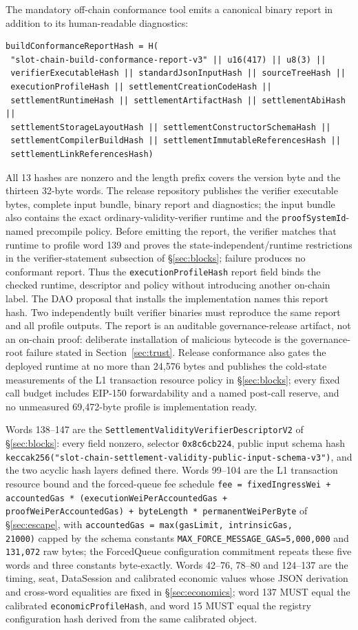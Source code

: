 \documentclass[a4paper,11pt]{article}
\newcommand{\code}[1]{\nolinkurl{#1}}
\begin{document}
The mandatory off-chain conformance tool emits a canonical binary report in
addition to its human-readable diagnostics:
\begin{verbatim}
buildConformanceReportHash = H(
 "slot-chain-build-conformance-report-v3" || u16(417) || u8(3) ||
 verifierExecutableHash || standardJsonInputHash || sourceTreeHash ||
 executionProfileHash || settlementCreationCodeHash ||
 settlementRuntimeHash || settlementArtifactHash || settlementAbiHash ||
 settlementStorageLayoutHash || settlementConstructorSchemaHash ||
 settlementCompilerBuildHash || settlementImmutableReferencesHash ||
 settlementLinkReferencesHash)
\end{verbatim}
All 13 hashes are nonzero and the length prefix covers the version byte and
the thirteen 32-byte words.  The release repository publishes the verifier
executable bytes, complete input bundle, binary report and diagnostics; the
input bundle also contains the exact ordinary-validity-verifier runtime and
the \code{proofSystemId}-named precompile policy.  Before emitting the report,
the verifier matches that runtime to profile word 139 and proves the
state-independent/runtime restrictions in the verifier-statement subsection of
\S\ref{sec:blocks}; failure produces no conformant report.  Thus the
\code{executionProfileHash} report field binds the checked runtime, descriptor
and policy without introducing another on-chain label.  The DAO proposal that
installs the implementation names this report hash.  Two independently built
verifier binaries must reproduce the same report and all profile outputs.  The
report is an auditable governance-release artifact, not an on-chain proof:
deliberate installation of malicious bytecode is the governance-root failure
stated in Section~\ref{sec:trust}.  Release conformance also gates the
deployed runtime at no more than 24,576 bytes and publishes the cold-state
measurements of the L1 transaction resource policy in \S\ref{sec:blocks};
every fixed call budget includes EIP-150 forwardability and a named post-call
reserve, and no unmeasured 69,472-byte profile is implementation ready.

Words 138--147 are the \code{SettlementValidityVerifierDescriptorV2} of
\S\ref{sec:blocks}: every field nonzero, selector \code{0x8c6cb224}, public
input schema hash
\code{keccak256("slot-chain-settlement-validity-public-input-schema-v3")},
and the two acyclic hash layers defined there.  Words 99--104 are the L1
transaction resource bound and the forced-queue fee schedule
\code{fee = fixedIngressWei + accountedGas * (executionWeiPerAccountedGas +
proofWeiPerAccountedGas) + byteLength * permanentWeiPerByte} of
\S\ref{sec:escape}, with \code{accountedGas = max(gasLimit, intrinsicGas,
21000)} capped by the schema constants \code{MAX_FORCE_MESSAGE_GAS=5,000,000}
and \code{131,072} raw bytes; the ForcedQueue configuration commitment repeats
these five words and three constants byte-exactly.  Words 42--76, 78--80 and
124--137 are the timing, seat, DataSession and calibrated economic values whose
JSON derivation and cross-word equalities are fixed in \S\ref{sec:economics};
word 137 MUST equal the calibrated \code{economicProfileHash}, and word 15
MUST equal the registry configuration hash derived from the same calibrated
object.
\end{document}
